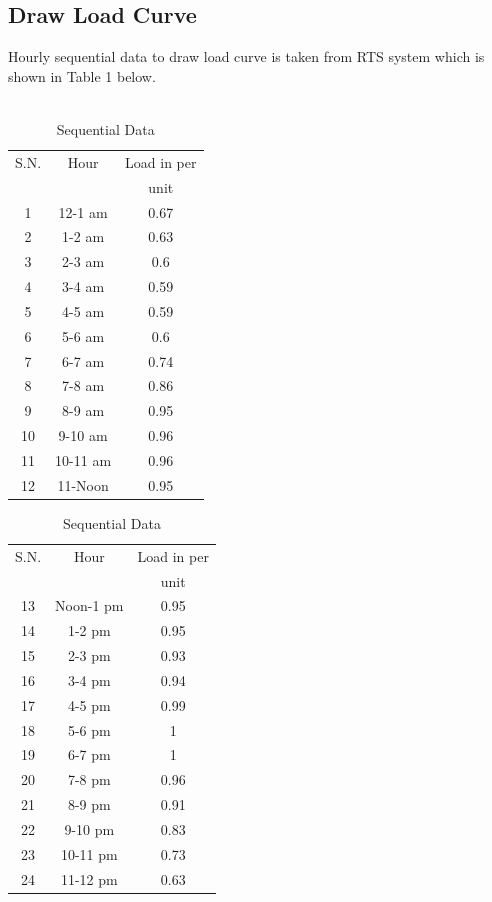 \documentclass[12pt]{article}
\begin{document}
\subsection{Draw Load Curve}
\bigskip
Hourly sequential data to draw load curve is taken from RTS system which is
shown in Table 1 below.\\\\
\begin{table}[!hbt]
\centering
\caption{Sequential Data}
\smallskip
\begin{tabular}{|c|c|c|}
\hline 
S.N. & Hour & Load in per \\ 
 & & unit \\ 
\hline 
1 & 12-1 am & 0.67 \\ 
\hline 
2 & 1-2 am & 0.63 \\ 
\hline 
3 & 2-3 am & 0.6 \\ 
\hline 
4 & 3-4 am & 0.59 \\ 
\hline 
5 & 4-5 am & 0.59 \\ 
\hline 
6 & 5-6 am & 0.6 \\ 
\hline 
7 & 6-7 am & 0.74 \\ 
\hline 
8 & 7-8 am & 0.86 \\ 
\hline 
9 & 8-9 am & 0.95 \\ 
\hline 
10 & 9-10 am & 0.96 \\ 
\hline 
11 & 10-11 am & 0.96 \\ 
\hline 
12 & 11-Noon & 0.95 \\ 
\hline 
\end{tabular}
\hspace{1cm}
\begin{tabular}{|c|c|c|}
 \hline 
S.N. & Hour & Load in per \\ 
 & & unit \\  
 \hline 
 13 & Noon-1 pm & 0.95 \\ 
 \hline 
 14 & 1-2 pm & 0.95 \\ 
 \hline 
 15 & 2-3 pm & 0.93 \\ 
 \hline 
 16 & 3-4 pm & 0.94 \\ 
 \hline 
 17 & 4-5 pm & 0.99 \\ 
 \hline 
 18 & 5-6 pm & 1 \\ 
 \hline 
 19 & 6-7 pm & 1 \\ 
 \hline 
 20 & 7-8 pm & 0.96 \\ 
 \hline 
 21 & 8-9 pm & 0.91 \\ 
 \hline 
 22 & 9-10 pm & 0.83 \\ 
 \hline 
 23 & 10-11 pm & 0.73 \\ 
 \hline 
 24 & 11-12 pm & 0.63 \\ 
 \hline 
 \end{tabular}  
\end{table}\\
\end{document}
